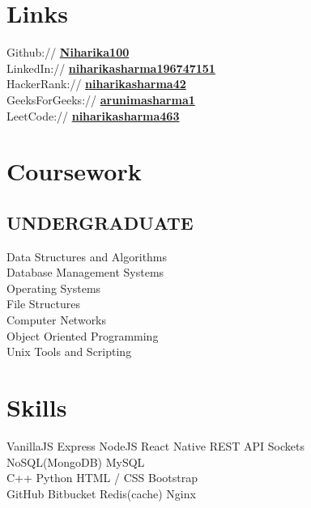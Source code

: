\documentclass[]{deedy-resume-openfont}
\begin{document}
\begin{minipage}[t]{0.33\textwidth}

\section{Links} 
Github:// \href{https://github.com/Niharika100}{\bf Niharika100} \\
LinkedIn:// \href{https://www.linkedin.com/in/niharikasharma196747151/}{\bf niharikasharma196747151} \\
HackerRank:// \href{https://www.hackerrank.com/niharikasharma42}{\bf niharikasharma42} \\
GeeksForGeeks:// \href{https://auth.geeksforgeeks.org/user/arunimasharma1/profile}{\bf arunimasharma1} \\
LeetCode:// \href{https://leetcode.com/niharikasharma463/}{\bf niharikasharma463}


\sectionsep
\section{Coursework}
\subsection{UNDERGRADUATE}
Data Structures and Algorithms\\
Database Management Systems\\
Operating Systems\\
File Structures\\
Computer Networks\\
Object Oriented Programming\\
Unix Tools and Scripting\\
\sectionsep


\section{Skills}
\textbullet{} VanillaJS
\textbullet{} Express
\textbullet{} NodeJS 
\textbullet{} React Native 
\textbullet{} REST API
\textbullet{} Sockets \\
\textbullet{} NoSQL(MongoDB)
\textbullet{} MySQL \\
\textbullet{} C++ 
\textbullet{} Python 
\textbullet{} HTML / CSS 
\textbullet{} Bootstrap \\
\textbullet{} GitHub 
\textbullet{} Bitbucket
\textbullet{} Redis(cache)
\textbullet{} Nginx
\sectionsep

%
%

\end{minipage} 
\end{document}
